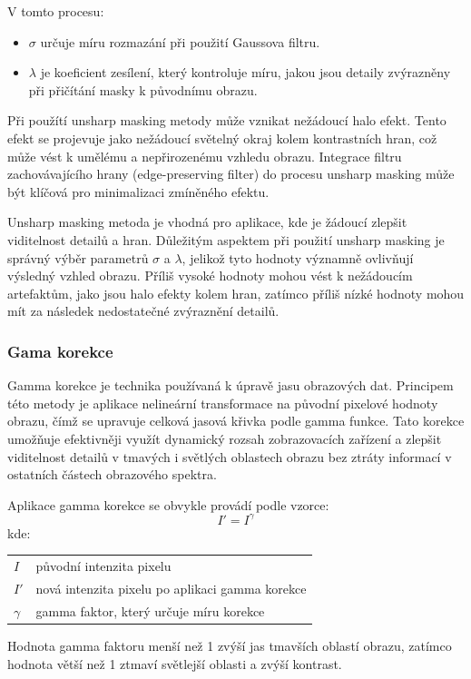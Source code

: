 \documentclass[male,czech,api_ing]{thesis}
\makeatletter
\newenvironment{conditions}[1][kde:]
    {#1 \begin{tabular}[t]{>{$}l<{$} @{${}={}$} >{\raggedright\arraybackslash}p{10cm}}}
    {\end{tabular}}
\makeatother
\begin{document}
V tomto procesu:
\begin{itemize}
    \item $\sigma$ určuje míru rozmazání při použití Gaussova filtru.
    \item $\lambda$ je koeficient zesílení, který kontroluje míru, jakou jsou detaily zvýrazněny při přičítání masky k původnímu obrazu.
\end{itemize}

Při použítí unsharp masking metody může vznikat nežádoucí halo efekt. Tento efekt se projevuje jako nežádoucí světelný okraj kolem kontrastních hran, což může vést k umělému a nepřirozenému vzhledu obrazu. Integrace filtru zachovávajícího hrany (edge-preserving filter) do procesu unsharp masking může být klíčová pro minimalizaci zmíněného efektu. \cite{UnsharpMasking}

Unsharp masking metoda je vhodná pro aplikace, kde je žádoucí zlepšit viditelnost detailů a hran. Důležitým aspektem při použití unsharp masking je správný výběr parametrů $\sigma$ a $\lambda$, jelikož tyto hodnoty významně ovlivňují výsledný vzhled obrazu. Příliš vysoké hodnoty mohou vést k nežádoucím artefaktům, jako jsou halo efekty kolem hran, zatímco příliš nízké hodnoty mohou mít za následek nedostatečné zvýraznění detailů.

\subsubsection{Gama korekce}
Gamma korekce je technika používaná k úpravě jasu obrazových dat. Principem této metody je aplikace nelineární transformace na původní pixelové hodnoty obrazu, čímž se upravuje celková jasová křivka podle gamma funkce. Tato korekce umožňuje efektivněji využít dynamický rozsah zobrazovacích zařízení a zlepšit viditelnost detailů v tmavých i světlých oblastech obrazu bez ztráty informací v ostatních částech obrazového spektra. \cite{PreprocessingBook}

Aplikace gamma korekce se obvykle provádí podle vzorce:
\begin{equation}
    I' = I^\gamma
\end{equation}
\begin{conditions}
    I &  původní intenzita pixelu \\
    I' & nová intenzita pixelu po aplikaci gamma korekce \\
    \gamma & gamma faktor, který určuje míru korekce
\end{conditions}

Hodnota gamma faktoru menší než 1 zvýší jas tmavších oblastí obrazu, zatímco hodnota větší než 1 ztmaví světlejší oblasti a zvýší kontrast.
 
\end{document}
